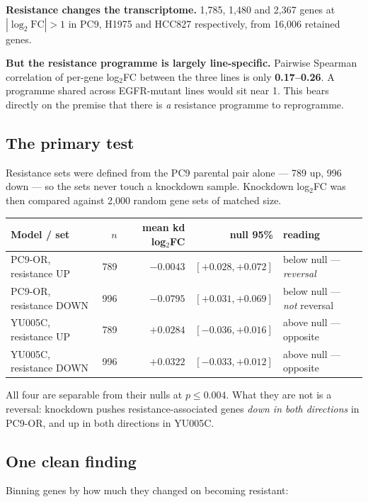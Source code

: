 \documentclass[11pt,a4paper]{article}
\begin{document}
\textbf{Resistance changes the transcriptome.} 1{,}785, 1{,}480 and 2{,}367 genes at
$|\log_2\text{FC}| > 1$ in PC9, H1975 and HCC827 respectively, from 16{,}006 retained genes.

\textbf{But the resistance programme is largely line-specific.} Pairwise Spearman correlation of
per-gene log$_2$FC between the three lines is only \textbf{0.17--0.26}. A programme shared across
EGFR-mutant lines would sit near 1. This bears directly on the premise that there is \emph{a}
resistance programme to reprogramme.

\subsection{The primary test}

Resistance sets were defined from the PC9 parental pair alone --- 789 up, 996 down --- so the sets
never touch a knockdown sample. Knockdown log$_2$FC was then compared against 2{,}000 random gene
sets of matched size.

\begin{center}
\begin{tabular}{@{}lrrrl@{}}
\toprule
\textbf{Model / set} & \textbf{$n$} & \textbf{mean kd log$_2$FC} & \textbf{null 95\%} &
\textbf{reading} \\
\midrule
PC9-OR, resistance UP & 789 & $-0.0043$ & $[+0.028, +0.072]$ & below null --- \emph{reversal} \\
PC9-OR, resistance DOWN & 996 & $-0.0795$ & $[+0.031, +0.069]$ & below null --- \emph{not} reversal \\
\midrule
YU005C, resistance UP & 789 & $+0.0284$ & $[-0.036, +0.016]$ & above null --- opposite \\
YU005C, resistance DOWN & 996 & $+0.0322$ & $[-0.033, +0.012]$ & above null --- opposite \\
\bottomrule
\end{tabular}
\end{center}

All four are separable from their nulls at $p \leq 0.004$. What they are not is a reversal:
knockdown pushes resistance-associated genes \emph{down in both directions} in PC9-OR, and up in
both directions in YU005C.

\subsection{One clean finding}

Binning genes by how much they changed on becoming resistant:
\end{document}
